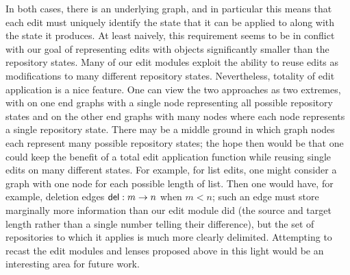 In both cases, there is an underlying graph, and in particular this means
that each edit must uniquely identify the state that it can be applied to
along with the state it produces. At least naively, this requirement seems
to be in conflict with our goal of representing edits with objects
significantly smaller than the repository states. Many of our edit modules
exploit the ability to reuse edits as modifications to many different
repository states. Nevertheless, totality of edit application is a nice
feature. One can view the two approaches as two extremes, with on one end
graphs with a single node representing all possible repository states and on
the other end graphs with many nodes where each node represents a single
repository state. There may be a middle ground in which graph nodes each
represent many possible repository states; the hope then would be that one
could keep the benefit of a total edit application function while reusing
single edits on many different states. For example, for list edits, one
might consider a graph with one node for each possible length of list. Then
one would have, for example, deletion edges $\mathsf{del} : m \to n$ when
$m<n$; such an edge must store marginally more information than our edit
module did (the source and target length rather than a single number telling
their difference), but the set of repositories to which it applies is much
more clearly delimited. Attempting to recast the edit modules and lenses
proposed above in this light would be an interesting area for future work.

